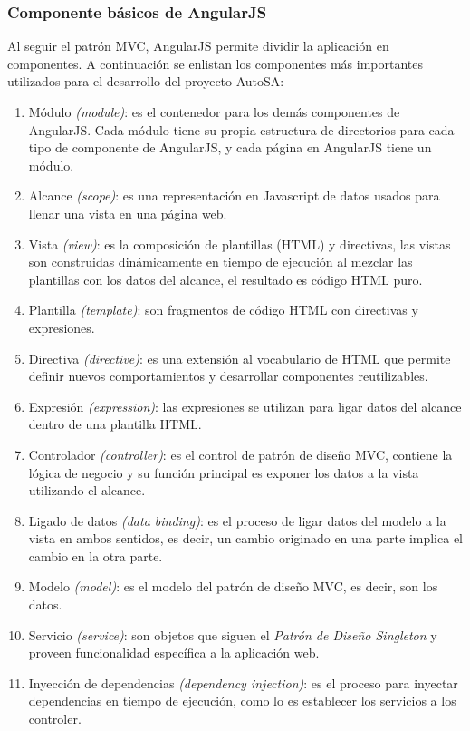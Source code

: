 \subsubsection{Componente básicos de AngularJS}
Al seguir el patrón MVC, AngularJS permite dividir la aplicación en componentes. A continuación se enlistan los componentes más importantes utilizados para el desarrollo del proyecto AutoSA\cite{FullStackAngularJS, LearningAngularJS, AngularJSEssentials}:
\begin{enumerate}
	\item Módulo \textit{(module)}: es el contenedor para los demás componentes de AngularJS. Cada módulo tiene su propia estructura de directorios para cada tipo de componente de AngularJS, y cada página en AngularJS tiene un módulo.
	\item Alcance \textit{(scope)}: es una representación en Javascript de datos usados para llenar una vista en una página web.
	\item Vista \textit{(view)}: es la composición de plantillas (HTML) y directivas, las vistas son construidas dinámicamente en tiempo de ejecución al mezclar las plantillas con los datos del alcance, el resultado es código HTML puro.
	\item Plantilla \textit{(template)}: son fragmentos de código HTML con directivas y expresiones.
	\item Directiva \textit{(directive)}: es una extensión al vocabulario de HTML que permite definir nuevos comportamientos y desarrollar componentes reutilizables.
	\item Expresión \textit{(expression)}: las expresiones se utilizan para ligar datos del alcance dentro de una plantilla HTML.
	\item Controlador \textit{(controller)}: es el control de patrón de diseño MVC, contiene la lógica de negocio y su función principal es exponer los datos a la vista utilizando el alcance.
	\item Ligado de datos \textit{(data binding)}: es el proceso de ligar datos del modelo a la vista en ambos sentidos, es decir, un cambio originado en una parte implica el cambio en la otra parte.
	\item Modelo \textit{(model)}: es el modelo del patrón de diseño MVC, es decir, son los datos.
	\item Servicio \textit{(service)}: son objetos que siguen el \textit{Patrón de Diseño Singleton} y proveen funcionalidad específica a la aplicación web.
	\item Inyección de dependencias \textit{(dependency injection)}: es el proceso para inyectar dependencias en tiempo de ejecución, como lo es establecer los servicios a los controler.
\end{enumerate}

